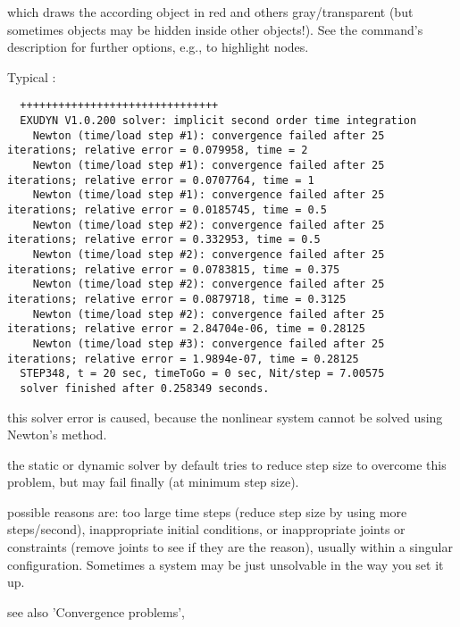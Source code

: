 %
which draws the according object in red and others gray/transparent (but sometimes objects may be hidden inside other objects!). See the command's description for further options, e.g., to highlight nodes.
\vspace{12pt}\\
\item Typical :
\plainlststyle
\begin{lstlisting}
  +++++++++++++++++++++++++++++++
  EXUDYN V1.0.200 solver: implicit second order time integration
    Newton (time/load step #1): convergence failed after 25 iterations; relative error = 0.079958, time = 2
    Newton (time/load step #1): convergence failed after 25 iterations; relative error = 0.0707764, time = 1
    Newton (time/load step #1): convergence failed after 25 iterations; relative error = 0.0185745, time = 0.5
    Newton (time/load step #2): convergence failed after 25 iterations; relative error = 0.332953, time = 0.5
    Newton (time/load step #2): convergence failed after 25 iterations; relative error = 0.0783815, time = 0.375
    Newton (time/load step #2): convergence failed after 25 iterations; relative error = 0.0879718, time = 0.3125
    Newton (time/load step #2): convergence failed after 25 iterations; relative error = 2.84704e-06, time = 0.28125
    Newton (time/load step #3): convergence failed after 25 iterations; relative error = 1.9894e-07, time = 0.28125
  STEP348, t = 20 sec, timeToGo = 0 sec, Nit/step = 7.00575
  solver finished after 0.258349 seconds.
\end{lstlisting}
\onlyRST{\rstStartNewLine}
%
\bi
\item[$\ra$] this solver error is caused, because the nonlinear system cannot be solved using Newton's method.
\item[$\ra$] the static or dynamic solver by default tries to reduce step size to overcome this problem, but may fail finally (at minimum step size).
\item[$\ra$] possible reasons are: too large time steps (reduce step size by using more steps/second), inappropriate initial conditions, or inappropriate joints or constraints (remove joints to see if they are the reason), usually within a singular configuration. Sometimes a system may be just unsolvable in the way you set it up.
\item[$\ra$] see also 'Convergence problems', 
